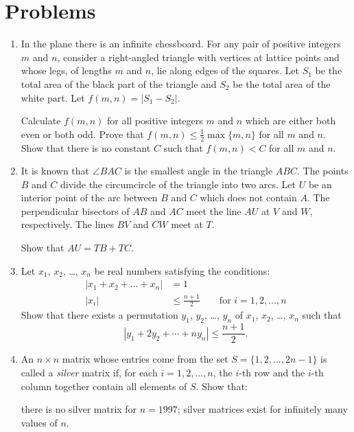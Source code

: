 \documentclass[11pt]{scrartcl}
\begin{document}
\section{Problems}
\begin{enumerate}[\bfseries 1.]
\item %
In the plane there is an infinite chessboard.
For any pair of positive integers $m$ and $n$,
consider a right-angled triangle with vertices at lattice points
and whose legs, of lengths $m$ and $n$, lie along edges of the squares.
Let $S_1$ be the total area of the black part of the triangle
and $S_2$ be the total area of the white part.
Let $f(m,n) = | S_1 - S_2 |$.


\begin{enumerate}[(a)]
  \ii Calculate $f(m,n)$ for all positive integers $m$ and $n$
  which are either both even or both odd.
  \ii Prove that $f(m,n) \leq \frac 12 \max \{m,n\}$ for all $m$ and $n$.
  \ii Show that there is no constant $C$
  such that $f(m,n) < C$ for all $ m$ and $ n$.
\end{enumerate}

\item %
It is known that $ \angle BAC$
is the smallest angle in the triangle $ ABC$.
The points $ B$ and $ C$ divide
the circumcircle of the triangle into two arcs.
Let $ U$ be an interior point of the arc
between $ B$ and $ C$ which does not contain $ A$.
The perpendicular bisectors of $ AB$ and $ AC$
meet the line $ AU$ at $ V$ and $ W$, respectively.
The lines $ BV$ and $ CW$ meet at $ T$.

Show that $ AU = TB + TC$.

\item %
Let $x_1$, $x_2$, \dots, $x_n$ be real numbers satisfying the conditions:
\begin{align*}
  |x_1 + x_2 + \dots + x_n| &= 1 \\
  |x_i| &\le \frac{n+1}{2} \qquad \text{for } i= 1,2, \dots, n
\end{align*}
Show that there exists a permutation $y_1$, $y_2$, \dots, $y_n$
of $x_1$, $x_2$, \dots, $x_n$ such that
\[ | y_1 + 2 y_2 + \dotsb + n y_n | \leq \frac {n + 1}{2}. \]

\item %
An $n \times n$ matrix whose entries come
from the set $S = \{1, 2, \dots , 2n - 1\}$
is called a \emph{silver} matrix if,
for each $i = 1, 2, \dots , n$,
the $i$-th row and the $i$-th column together
contain all elements of $S$. Show that:
\begin{enumerate}[(a)]
\ii there is no silver matrix for $n = 1997$;
\ii silver matrices exist for infinitely many values of $n$.
\end{enumerate}


\end{enumerate}
\end{document}
